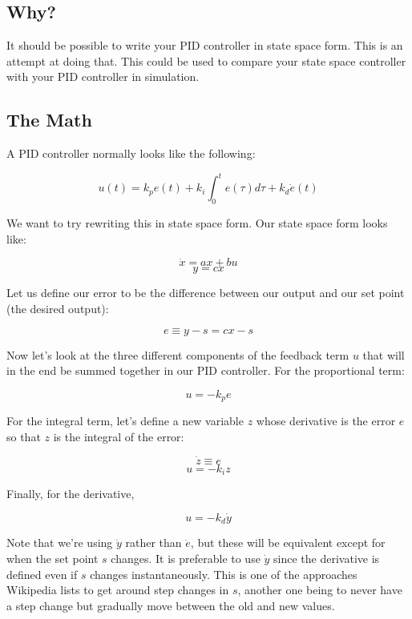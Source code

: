\documentclass[10pt,letterpaper]{article}
\title{\doctitle}
\author{Garrett Wilson}
\begin{document}
\maketitle
\subsection*{Why?}
It should be possible to write your PID controller in state space form. This is an attempt at doing that. This could be used to compare your state space controller with your PID controller in simulation.

\subsection*{The Math}
A PID controller normally looks like the following:

\[u(t) = k_p e(t) + k_i \int_{0}^{t} e(\tau) d\tau + k_d \dot{e}(t) \]

We want to try rewriting this in state space form. Our state space form looks like:

\begin{equation} \label{eq:state}
\dot{x} = ax+bu
\end{equation}
\begin{equation} \label{eq:output}
y = cx
\end{equation}

Let us define our error to be the difference between our output and our set point (the desired output):

\[ e \equiv y - s = cx - s \]

Now let's look at the three different components of the feedback term $u$ that will in the end be summed together in our PID controller. For the proportional term:

\[ u = -k_p e \]

For the integral term, let's define a new variable $z$ whose derivative is the error $e$ so that $z$ is the integral of the error:

\[ \dot{z} \equiv e \]
\[ u = -k_i z \]

Finally, for the derivative,

\[ u = -k_d \dot{y} \]

Note that we're using $\dot{y}$ rather than $\dot{e}$, but these will be equivalent except for when the set point $s$ changes. It is preferable to use $\dot{y}$ since the derivative is defined even if $s$ changes instantaneously. This is one of the approaches Wikipedia lists to get around step changes in $s$, another one being to never have a step change but gradually move between the old and new values.
\end{document}
